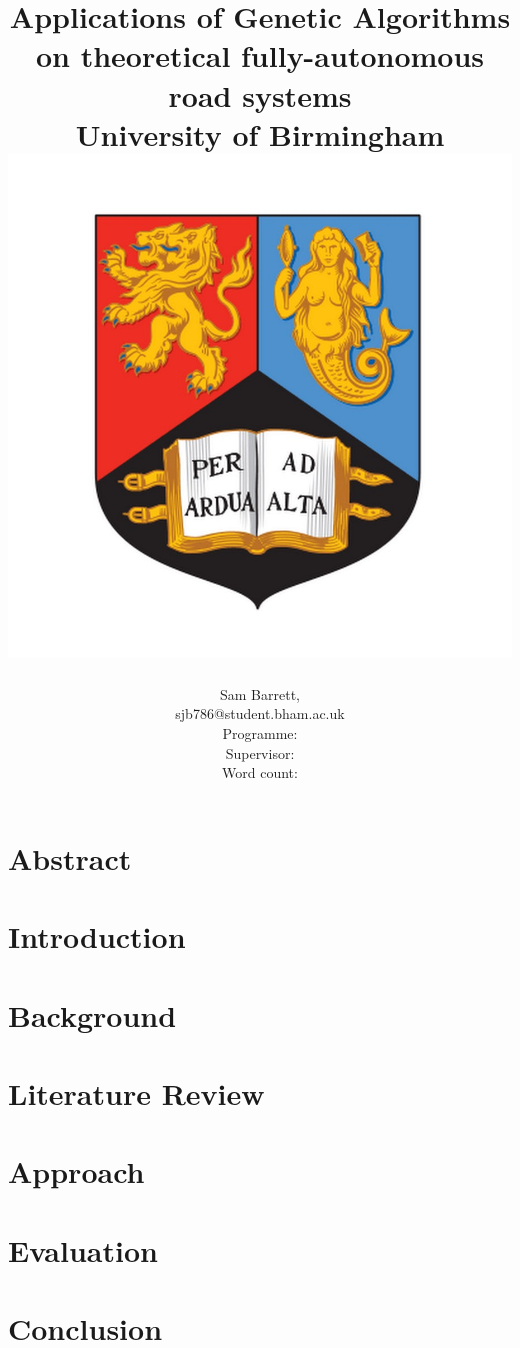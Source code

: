 \documentclass[a4paper,12pt]{report}
\title{
	{Applications of Genetic Algorithms on theoretical fully-autonomous road systems} \\
	{\large University of Birmingham} \\ 
	{\includegraphics[scale=0.3]{uobcrest.jpg}}
}
\author{Sam Barrett, \ID \\ sjb786@student.bham.ac.uk \\ Programme: \programme \\ Supervisor: \supervisor \\ Word count: }
\begin{document}
\maketitle
\listoftodos

\chapter*{Abstract}\label{chap:Abs}

\tableofcontents
\listoffigures
\chapter{Introduction}\label{chap:Intro}

\chapter{Background}\label{chap:Background}

\chapter{Literature Review}\label{chap:LitRev}

\chapter{Approach}\label{chap:ClassicalApproach}

%
\chapter{Evaluation}\label{chap:Eval}

\chapter{Conclusion}\label{chap:Conclusion}




\end{document}
